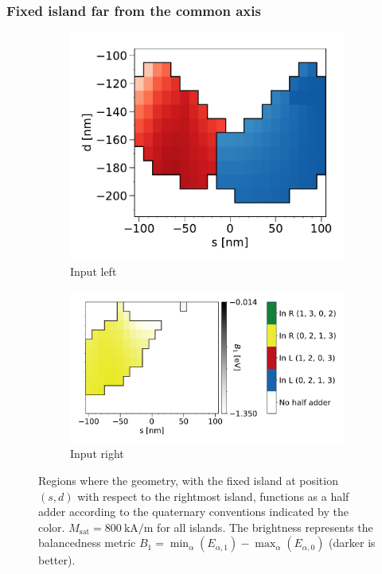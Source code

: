 \documentclass[11pt,a4paper,english,twoside]{article}
\begin{document}
\subsubsection{Fixed island far from the common axis}
\begin{figure}
    \centering
    \begin{subfigure}[t]{0.396\textwidth}
        \includegraphics[width=\textwidth]{Figures/half_adder/sweep/000006_d-s/table(d100-210_10,s-100-100_10)_balanced1_L.pdf}
        \caption{Input left}
    \label{fig:HalfAdder_000006_sweep_d-s_balanced1-L}
    \end{subfigure}
    \begin{subfigure}[t]{0.594\textwidth}
        \includegraphics[width=\textwidth]{Figures/half_adder/sweep/000006_d-s/table(d100-210_10,s-100-100_10)_balanced1_R.pdf}
        \caption{Input right}
    \label{fig:HalfAdder_000006_sweep_d-s_balanced1-R}
    \end{subfigure}
    \caption{Regions where the geometry, with the fixed island at position $(s, d)$ with respect to the rightmost island, functions as a half adder according to the quaternary conventions indicated by the color. $M_\mathrm{sat} = \SI{800}{\kilo\ampere\per\metre}$ for all islands. The brightness represents the balancedness metric $B_1 = \min_\alpha(E_{\alpha,1}) - \max_\alpha(E_{\alpha,0})$ (darker is better).}
    \label{fig:HalfAdder_000006_sweep_d-s_balanced1}
\end{figure}
\end{document}
